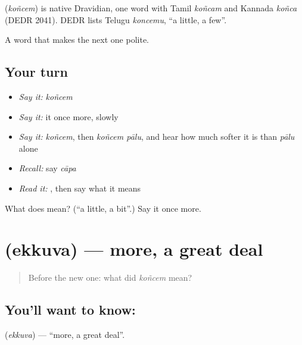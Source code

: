 \begin{cousinweb}
\textbf{} (\emph{koñcem}) is native Dravidian, one word with Tamil \emph{koñcam} and Kannada \emph{koñca} (DEDR 2041). DEDR lists Telugu \emph{koncemu}, \textquotedblleft{}a little, a few\textquotedblright{}.
\end{cousinweb}

\begin{grammarlens}[title={What you've built}]
A word that makes the next one polite.
\end{grammarlens}

\subsection*{Your turn}
\begin{itemize}
\raggedright
  \item \emph{Say it:} \emph{koñcem}
  \item \emph{Say it:} it once more, slowly
  \item \emph{Say it:} \emph{koñcem}, then \emph{koñcem pālu}, and hear how much softer it is than \emph{pālu} alone
  \item \emph{Recall:} say \emph{cāpa}
  \item \emph{Read it:} \textbf{}, then say what it means
\end{itemize}

\begin{tcolorbox}[breakable,colback=teal!4,colframe=teal!35!black,title={Before you move on}]
What does  mean? (\textquotedblleft{}a little, a bit\textquotedblright{}.) Say it once more.
\end{tcolorbox}
\section[\texorpdfstring{\te{ఎక్కువ} (ekkuva)}{ఎక్కువ (ekkuva)}]{ (ekkuva) — more, a great deal}

\label{lesson:TE-C58-more}



\begin{quote}
Before the new one: what did \emph{koñcem} mean?
\end{quote}

\subsection*{You'll want to know: }
\textbf{} (\emph{ekkuva}) — \textquotedblleft{}more, a great deal\textquotedblright{}.

